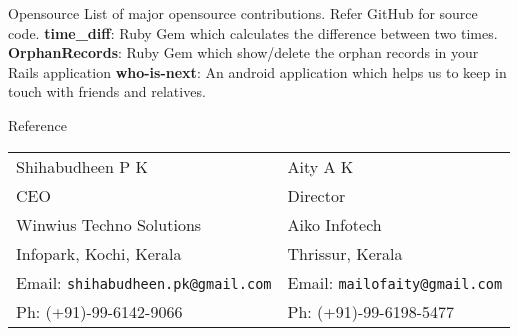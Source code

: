 \documentclass{resume}
\begin{document}

\begin{category}{Opensource}
  \citemnobullet List of major opensource contributions. Refer GitHub for source code.
  \citembullet \textbf{time\_diff}: Ruby Gem which calculates the difference between two times.
  \citembullet \textbf{OrphanRecords}: Ruby Gem which show/delete the orphan records in your Rails application
  \citembullet \textbf{who-is-next}: An android application which helps us to keep in touch with friends and relatives.
\end{category}


\begin{category}{Reference}
  \citemnobullet \\
  \begin{tabular}{ll}Shihabudheen P K&Aity A K\\
    CEO&Director\\
    Winwius Techno Solutions&Aiko Infotech\\
    Infopark, Kochi, Kerala&Thrissur, Kerala\\
    Email: \mbox{\small\tt shihabudheen.pk@gmail.com}&Email: \mbox{\small\tt mailofaity@gmail.com}\\
    Ph: (+91)-99-6142-9066&Ph: (+91)-99-6198-5477
  \end{tabular}
\end{category}
\end{document}
